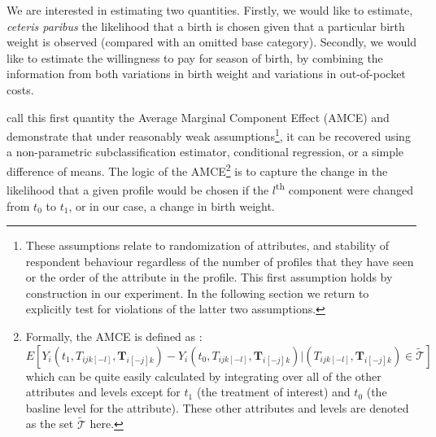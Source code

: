 \documentclass[a4paper, 11pt]{article}
\begin{document}
\begin{spacing}{1.4}
We are interested in estimating two quantities.  Firstly, we would like to
estimate, \emph{ceteris paribus} the likelihood that a birth is chosen given
that a particular birth weight is observed (compared with an omitted base
category).  Secondly, we would like to estimate the willingness to pay for
season of birth, by combining the information from both variations in birth
weight and variations in out-of-pocket costs.

\citet{Hainmuelleretal2013} call this first quantity the Average Marginal
Component Effect (AMCE) and demonstrate that under reasonably weak
assumptions\footnote{These assumptions relate to randomization of attributes,
  and stability of respondent behaviour regardless of the number of profiles
  that they have seen or the order of the attribute in the profile.  This
  first assumption holds by construction in our experiment.  In the following
  section we return to explicitly test for violations of the latter two
  assumptions.}, it can be recovered using a non-parametric subclassification
estimator, conditional regression, or a simple difference of means.  The
logic of the AMCE\footnote{Formally, the AMCE is defined as
  \citep{Hainmuelleretal2013}:
  \[
  E[Y_i(t_1,T_{ijk[-l]},\mathbf{T}_{i[-j]k})-Y_i(t_0,T_{ijk[-l]},\mathbf{T}_{i[-j]k})|(T_{ijk[-l]},\mathbf{T}_{i[-j]k})\in\tilde{\mathcal{T}}]
  \]
  which can be quite easily calculated by integrating over all of the other
  attributes and levels except for $t_1$ (the treatment of interest) and $t_0$
  (the basline level for the attribute). These other attributes and levels are
  denoted as the set $\tilde{\mathcal{T}}$ here.} is to capture the change in
the likelihood that a given profile would be chosen if the
$l$\textsuperscript{th} component were changed from $t_0$ to $t_1$, or in our
case, a change in birth weight.


\end{spacing}
\end{document}
